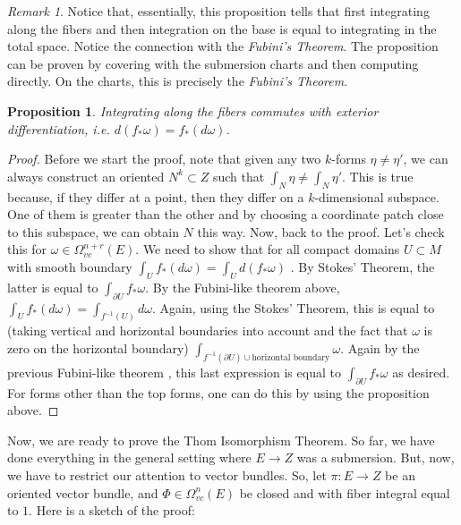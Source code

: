 \documentclass[12pt]{amsart}
\newtheorem{proposition}{Proposition}
\theoremstyle{remark}
\newtheorem{remark}{Remark}
\begin{document}
\begin{remark}
Notice that, essentially, this proposition tells that first integrating along the fibers and then integration on the base is equal to integrating in the total space. Notice the connection with the \textit{Fubini's Theorem}. The proposition can be proven by covering with the submersion charts and then computing directly. On the charts, this is precisely the \textit{Fubini's Theorem}. 
\end{remark}
\begin{proposition}
Integrating along the fibers commutes with exterior differentiation, i.e. $d(f_*\omega)=f_*(d\omega)$.
\end{proposition}
\begin{proof}
Before we start the proof, note that given any two $k$-forms $\eta\neq\eta'$, we can always construct an oriented $N^k\subset Z$ such that $\int_N \eta\neq \int_N\eta'$. This is true because, if they differ at a point, then they differ on a $k$-dimensional subspace. One of them is greater than the other and by choosing a coordinate patch close to this subspace, we can obtain $N$ this way. Now, back to the proof.  Let's check this for $\omega\in\Omega_{vc}^{n+r}(E)$. We need to show that for all compact domains $U\subset M$ with smooth boundary $\int_U f_*(d\omega)=\int_U d(f_*\omega)$ . By Stokes' Theorem, the latter is equal to $\int_{\partial U}f_*\omega$. By the Fubini-like theorem above, $\int_Uf_*(d\omega)=\int_{f^{-1}(U)} d\omega$. Again, using the Stokes' Theorem, this is equal to (taking vertical and horizontal boundaries into account and the fact that $\omega$ is zero on the horizontal boundary) $\int_{f^{-1}(\partial U)\cup {\text{horizontal boundary}}}\omega$. Again by the previous Fubini-like theorem , this last expression is equal to $\int_{\partial U}f_*\omega$ as desired. For forms other than the top forms, one can do this by using the proposition above.
\end{proof}
Now, we are ready to prove the Thom Isomorphism Theorem. So far, we have done everything in the general setting where $E\to Z$ was a submersion. But, now, we have to restrict our attention to vector bundles. So, let $\pi:E\to Z$ be an oriented vector bundle, and $\Phi\in\Omega_{vc}^n(E)$ be closed and with fiber integral equal to $1$. Here is a sketch of the proof:
\end{document}
